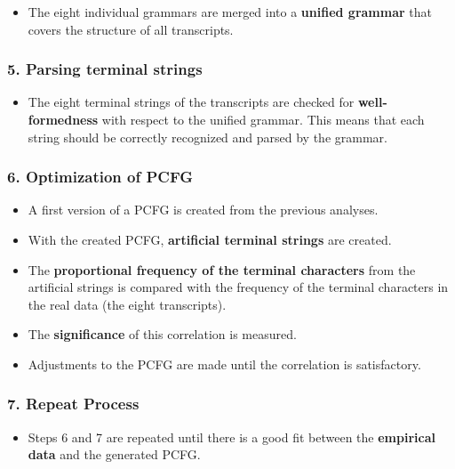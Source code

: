 \documentclass[
]{article}
\begin{document}
\begin{itemize}
\item
  The eight individual grammars are merged into a \textbf{unified
  grammar} that covers the structure of all transcripts.
\end{itemize}

\subsubsection{\texorpdfstring{5. \textbf{Parsing terminal
strings}}{5. Parsing terminal strings}}\label{parsing-terminal-strings}

\begin{itemize}
\item
  The eight terminal strings of the transcripts are checked for
  \textbf{well-formedness} with respect to the unified grammar. This
  means that each string should be correctly recognized and parsed by
  the grammar.
\end{itemize}

\subsubsection{\texorpdfstring{6. \textbf{Optimization of
PCFG}}{6. Optimization of PCFG}}\label{optimization-of-pcfg}

\begin{itemize}
\item
  A first version of a PCFG is created from the previous analyses.
\item
  With the created PCFG, \textbf{artificial terminal strings} are
  created.
\item
  The \textbf{proportional frequency of the terminal characters} from
  the artificial strings is compared with the frequency of the terminal
  characters in the real data (the eight transcripts).
\item
  The \textbf{significance} of this correlation is measured.
\item
  Adjustments to the PCFG are made until the correlation is
  satisfactory.
\end{itemize}

\subsubsection{\texorpdfstring{7. \textbf{Repeat
Process}}{7. Repeat Process}}\label{repeat-process}

\begin{itemize}
\item
  Steps 6 and 7 are repeated until there is a good fit between the
  \textbf{empirical data} and the generated PCFG.
\end{itemize}
\end{document}
